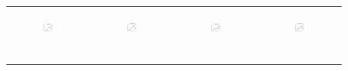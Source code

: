 \begin{figure}[ht]
\begin{tabular}{cccc}
\begin{subfigure}[b]{0.22\textwidth}
	  	\includegraphics[width=110pt]{images/diffFA_CF2G_friendster10M_setcover.eps}
			\caption{}
			\label{appfig:diffFA_CF2G_friendster10M_setcover}
	  \end{subfigure} &
	  \begin{subfigure}[b]{0.22\textwidth}
	  	\includegraphics[width=110pt]{images/diffFA_CF2G_arabic2005_setcover.eps}
			\caption{}
			\label{appfig:diffFA_CF2G_arabic2005_setcover}
	  \end{subfigure} &
	  \begin{subfigure}[b]{0.22\textwidth}
	  	\includegraphics[width=110pt]{images/diffFA_CF2G_uk2005_setcover.eps}
			\caption{}
			\label{appfig:diffFA_CF2G_uk2005_setcover}
	  \end{subfigure} &
	  \begin{subfigure}[b]{0.22\textwidth}
	  	\includegraphics[width=110pt]{images/diffFA_CF2G_it2004_setcover.eps}
			\caption{}
			\label{appfig:diffFA_CF2G_it2004_setcover}
	  \end{subfigure} \\
	  \begin{subfigure}[b]{0.22\textwidth}

\end{subfigure}
\end{tabular}
\end{figure}
